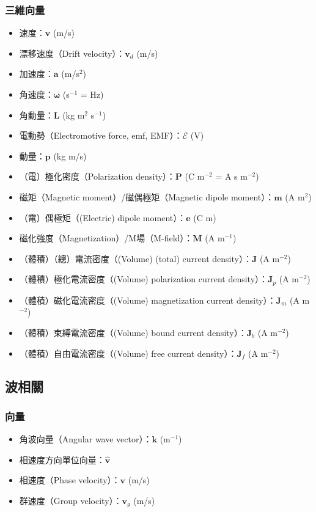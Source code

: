\documentclass[a4paper,12pt]{report}
\begin{document}
\begin{itemize}
\subsubsection{三維向量}
\begin{itemize}
\item 速度：$\mathbf{v}$ (m/s)
\item 漂移速度（Drift velocity）：$\mathbf{v}_d$ (m/s)
\item 加速度：$\mathbf{a}$ (m/s$^2$)
\item 角速度：$\boldsymbol{\omega}$ (s$^{-1}$ = Hz)
\item 角動量：$\mathbf{L}$ (kg m$^2$ s$^{-1}$)
\item 電動勢（Electromotive force, emf, EMF）：$\mathcal{E}$ (V)
\item 動量：$\mathbf{p}$ (kg m/s)
\item （電）極化密度（Polarization density）：$\mathbf{P}$ (C m$^{-2}$ = A s m$^{-2}$)
\item 磁矩（Magnetic moment）/磁偶極矩（Magnetic dipole moment）：$\mathbf{m}$ (A m$^2$)
\item （電）偶極矩（(Electric) dipole moment）：$\mathbf{e}$ (C m)
\item 磁化強度（Magnetization）/M場（M-field）：$\mathbf{M}$ (A m$^{-1}$)
\item （體積）（總）電流密度（(Volume) (total) current density）：$\mathbf{J}$ (A m$^{-2}$)
\item （體積）極化電流密度（(Volume) polarization current density）：$\mathbf{J}_p$ (A m$^{-2}$)
\item （體積）磁化電流密度（(Volume) magnetization current density）：$\mathbf{J}_m$ (A m$^{-2}$)
\item （體積）束縛電流密度（(Volume) bound current density）：$\mathbf{J}_b$ (A m$^{-2}$)
\item （體積）自由電流密度（(Volume) free current density）：$\mathbf{J}_f$ (A m$^{-2}$)
\end{itemize}
\subsection{波相關}
\subsubsection{向量}
\begin{itemize}
\item 角波向量（Angular wave vector）：$\mathbf{k}$ (m$^{-1}$)
\item 相速度方向單位向量：$\hat{\mathbf{v}}$
\item 相速度（Phase velocity）：$\mathbf{v}$ (m/s)
\item 群速度（Group velocity）：$\mathbf{v}_g$ (m/s)
\end{itemize}

\end{itemize}
\end{document}
